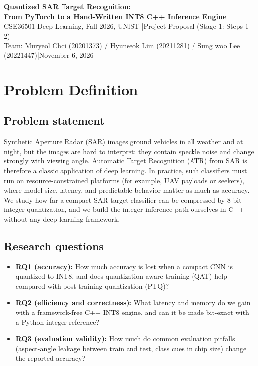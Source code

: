 \documentclass[10pt,letterpaper]{article}
\begin{document}
\begin{center}
{\Large\bfseries Quantized SAR Target Recognition:\\From PyTorch to a Hand-Written INT8 C++ Inference Engine}\\[4pt]
CSE36501 Deep Learning, Fall 2026, UNIST \quad|\quad Project Proposal (Stage 1: Steps 1--2)\\[2pt]
Team: Muryeol Choi (20201373) / Hyunseok Lim (20211281) / Sung woo Lee (20221447)\quad|\quad November 6, 2026
\end{center}

\section{Problem Definition}
\subsection{Problem statement}
Synthetic Aperture Radar (SAR) images ground vehicles in all weather and at night, but the images are hard to interpret: they contain speckle noise and change strongly with viewing angle. Automatic Target Recognition (ATR) from SAR is therefore a classic application of deep learning. In practice, such classifiers must run on resource-constrained platforms (for example, UAV payloads or seekers), where model size, latency, and predictable behavior matter as much as accuracy. We study how far a compact SAR target classifier can be compressed by 8-bit integer quantization, and we build the integer inference path ourselves in C++ without any deep learning framework.

\subsection{Research questions}
\begin{itemize}
\item \textbf{RQ1 (accuracy):} How much accuracy is lost when a compact CNN is quantized to INT8, and does quantization-aware training (QAT) help compared with post-training quantization (PTQ)?
\item \textbf{RQ2 (efficiency and correctness):} What latency and memory do we gain with a framework-free C++ INT8 engine, and can it be made bit-exact with a Python integer reference?
\item \textbf{RQ3 (evaluation validity):} How much do common evaluation pitfalls (aspect-angle leakage between train and test, class cues in chip size) change the reported accuracy?
\end{itemize}
\end{document}
